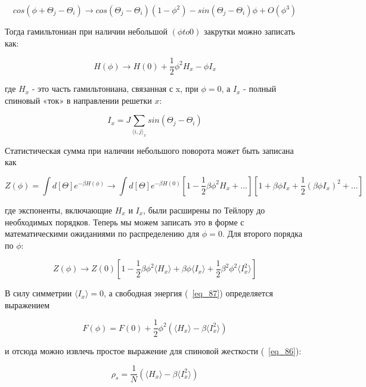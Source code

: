 \documentclass[11pt]{article}
\begin{document}
\begin{equation}
cos(\phi + \Theta_j - \Theta_i) \to cos(\Theta_j - \Theta_i)(1-\phi^2)-sin(\Theta_j - \Theta_i)\phi + O(\phi^3 )
\label{eq_90}
\end{equation}

Тогда гамильтониан при наличии небольшой $(\phi to 0)$ закрутки можно записать как:

\begin{equation}
H(\phi) \to H(0)+\frac{1}{2}\phi^2H_x-\phi I_x
\label{eq_91}
\end{equation}

где $H_x$ - это часть гамильтониана, связанная с x, при $\phi = 0$, а $I_x$ - полный спиновый «ток» в направлении решетки $x$:

\begin{equation}
I_x = J \sum\limits_{\langle i,j \rangle_x}sin(\Theta_j-\Theta_i)
\label{eq_92}
\end{equation}

Статистическая сумма при наличии небольшого поворота может быть записана как

\begin{equation}
Z(\phi)=\int d[\Theta]e^{-\beta H(\phi)} \to \int d[\Theta]e^{-\beta H(0)}[1-\frac{1}{2}\beta\phi^2 H_x + \dots][1+\beta\phi I_x + \frac{1}{2}(\beta\phi I_x)^2  + \dots ]
\label{eq_93}
\end{equation}

где экспоненты, включающие $H_x$ и $I_x$, были расширены по Тейлору до необходимых порядков. Теперь мы можем записать это в форме с математическими ожиданиями по распределению для $\phi = 0$. Для второго порядка по $\phi$:

\begin{equation}
Z(\phi) \to Z(0)[1-\frac{1}{2}\beta\phi^2\langle H_x \rangle + \beta \phi \langle I_x \rangle + \frac{1}{2}\beta^2\phi^2 \langle I_x^2 \rangle] 
\label{eq_94}
\end{equation}

В силу симметрии $\langle I_x \rangle = 0$, а свободная энергия (~\ref{eq_87}) определяется выражением

\begin{equation}
F(\phi) = F(0)+\frac{1}{2}\phi^2(\langle H_x \rangle -\beta \langle I_x^2 \rangle )
\label{eq_95}
\end{equation}

и отсюда можно извлечь простое выражение для спиновой жесткости (~\ref{eq_86}):

\begin{equation}
\rho_s = \frac{1}{N}(\langle H_x \rangle - \beta \langle I_x^2 \rangle)
\label{eq_96}
\end{equation}
\end{document}
